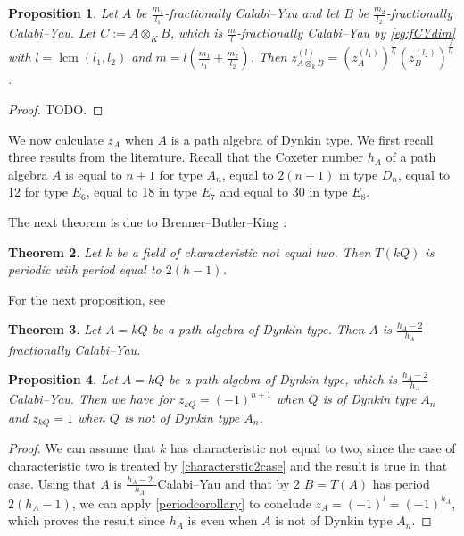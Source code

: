 \documentclass[a4paper,reqno,11pt]{amsart}
\newtheorem{theorem}{Theorem}[section]
\newtheorem{proposition}[theorem]{Proposition}
\theoremstyle{definition}
\numberwithin{equation}{section}
\begin{document}
\begin{proposition} \label{tensorproductforz}
Let $A$ be $\frac{m_1}{l_1}$-fractionally Calabi--Yau and let $B$ be $\frac{m_2}{l_2}$-fractionally Calabi--Yau.
Let $C:=A \otimes_K B$, which is $\frac{m}{l}$-fractionally Calabi--Yau by \ref{eg:fCYdim} with $l=\operatorname{lcm}(l_1,l_2)$ and $m= l (\frac{m_1}{l_1} + \frac{m_2}{l_2})$.
Then $z_{A \otimes_k B}^{(l)}= (z_A^{(l_1)})^{\frac{l}{l_1}} (z_B^{(l_2)})^{\frac{l}{l_2}}$.

\end{proposition}
\begin{proof}
TODO.
\end{proof}


We now calculate $z_A$ when $A$ is a path algebra of Dynkin type.
We first recall three results from the literature. Recall that the Coxeter number $h_A$ of a path algebra $A$ is equal to $n+1$ for type $A_n$, equal to $2(n-1)$ in type $D_n$, equal to 12 for type $E_6$, equal to 18 in type $E_7$ and equal to 30 in type $E_8$.


The next theorem is due to Brenner--Butler--King \cite[Theorem 2.1]{BBK}:

\begin{theorem} \label{BBKresult}
Let $k$ be a field of characteristic not equal two. Then $T(kQ)$ is periodic with period equal to $2(h-1)$.
\end{theorem}

For the next proposition, see \cite[Theorem 4.1]{MY}
\begin{theorem} \label{MYresult}
Let $A=kQ$ be a path algebra of Dynkin type. 
Then $A$ is $\frac{h_A-2}{h_A}$-fractionally Calabi--Yau.
\end{theorem}

\begin{proposition} \label{zcalculationhereditary}
Let $A=kQ$ be a path algebra of Dynkin type, which is $\frac{h_A-2}{h_A}$-Calabi--Yau.
Then we have for $z_{kQ}=(-1)^{n+1}$ when $Q$ is of Dynkin type $A_n$ and $z_{kQ}=1$ when $Q$ is not of Dynkin type $A_n$.

\end{proposition}
\begin{proof}
We can assume that $k$ has characteristic not equal to two, since the case of characteristic two is treated by \ref{characterstic2case} and the result is true in that case.
Using that $A$ is $\frac{h_A-2}{h_A}$-Calabi--Yau and that by \ref{BBKresult} $B=T(A)$ has period $2(h_A-1)$, we can apply \ref{periodcorollary} to conclude $z_A=(-1)^l=(-1)^{h_A}$, which proves the result since $h_A$ is even when $A$ is not of Dynkin type $A_n$.





\end{proof}
\end{document}
